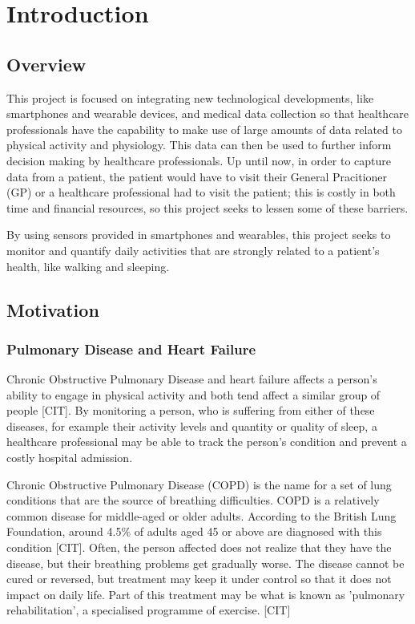 \part{Introduction}

    \chapter{Overview}

        This project is focused on integrating new technological developments, like smartphones and wearable devices, and medical data collection so that healthcare professionals have the capability to make use of large amounts of data related to physical activity and physiology. This data can then be used to further inform decision making by healthcare professionals. Up until now, in order to capture data from a patient, the patient would have to visit their General Pracitioner (GP) or a healthcare professional had to visit the patient; this is costly in both time and financial resources, so this project seeks to lessen some of these barriers. 

        By using sensors provided in smartphones and wearables, this project seeks to monitor and quantify daily activities that are strongly related to a patient's health, like walking and sleeping.

    \chapter{Motivation}

        \section{Pulmonary Disease and Heart Failure}

            Chronic Obstructive Pulmonary Disease and heart failure affects a person's ability to engage in physical activity and both tend affect a similar group of people [CIT]. By monitoring a person, who is suffering from either of these diseases, for example their activity levels and quantity or quality of sleep, a healthcare professional may be able to track the person's condition and prevent a costly hospital admission.

            Chronic Obstructive Pulmonary Disease (COPD) is the name for a set of lung conditions that are the source of breathing difficulties. COPD is a relatively common disease for middle-aged or older adults. According to the British Lung Foundation, around 4.5\% of adults aged 45 or above are diagnosed with this condition [CIT]. Often, the person affected does not realize that they have the disease, but their breathing problems get gradually worse. The disease cannot be cured or reversed, but treatment may keep it under control so that it does not impact on daily life. Part of this treatment may be what is known as 'pulmonary rehabilitation', a specialised programme of exercise. [CIT]

